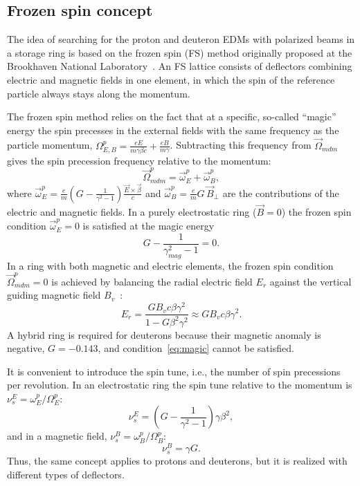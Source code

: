 \subsection{Frozen spin concept}

The idea of searching for the proton and deuteron EDMs with polarized beams in
a storage ring is based on the frozen spin (FS) method originally proposed at
the Brookhaven National Laboratory~\cite{Farley:2004hp,srEDM:2008}. An FS
lattice consists of deflectors combining electric and magnetic fields in one
element, in which the spin of the reference particle always stays along the
momentum.

The frozen spin method relies on the fact that at a specific, so-called
``magic'' energy the spin precesses in the external fields with the same
frequency as the particle momentum,
$\Omega^{p}_{E,B} = \frac{eE}{m\gamma\beta c} + \frac{eB}{m\gamma}$.
Subtracting this frequency from $\vec{\Omega}_{mdm}$ gives the spin precession
frequency relative to the momentum:
\begin{equation}
  \vec{\Omega}^{p}_{mdm} = \vec{\omega}^{p}_{E} + \vec{\omega}^{p}_{B},
  \label{eq:omega_p}
\end{equation}
where
$\vec{\omega}^{p}_{E} = \frac{e}{m}\left(G-\frac{1}{\gamma^2-1}\right)\frac{\vec{E}\times\vec{\beta}}{c}$
and $\vec{\omega}^{p}_{B} = \frac{e}{m}G\,\vec{B}_{\perp}$ are the
contributions of the electric and magnetic fields. In a purely electrostatic
ring ($\vec{B}=0$) the frozen spin condition $\vec{\omega}^{p}_{E} = 0$ is
satisfied at the magic energy
\begin{equation}
  G - \frac{1}{\gamma_{mag}^2-1} = 0 .
  \label{eq:magic}
\end{equation}
In a ring with both magnetic and electric elements, the frozen spin condition
$\vec{\Omega}^{p}_{mdm}=0$ is achieved by balancing the radial electric field
$E_r$ against the vertical guiding magnetic field $B_v$~\cite{srEDM:2008}:
\begin{equation}
  E_r = \frac{G B_v c\beta\gamma^2}{1-G\beta^2\gamma^2} \approx G B_v c\beta\gamma^2 .
  \label{eq:fs_hybrid}
\end{equation}
A hybrid ring is required for deuterons because their magnetic anomaly is
negative, $G = -0.143$, and condition~\eqref{eq:magic} cannot be satisfied.

It is convenient to introduce the spin tune, i.e., the number of spin
precessions per revolution. In an electrostatic ring the spin tune relative
to the momentum is $\nu_s^E = \omega^p_E/\Omega^p_E$:
\begin{equation}
  \nu_s^E = \left(G-\frac{1}{\gamma^2-1}\right)\gamma\beta^2 ,
  \label{eq:nu_e}
\end{equation}
and in a magnetic field, $\nu_s^B = \omega^p_B/\Omega^p_B$:
\begin{equation}
  \nu_s^B = \gamma G .
  \label{eq:nu_b}
\end{equation}
Thus, the same concept applies to protons and deuterons, but it is realized
with different types of deflectors.

